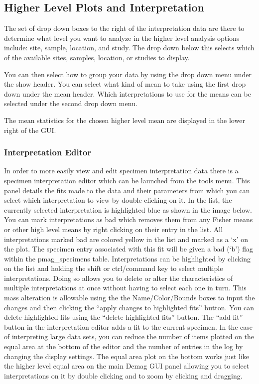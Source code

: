 \subsection{Higher Level Plots and
Interpretation}\label{higher-level-plots-and-interpretation}

The set of drop down boxes to the right of the interpretation data are
there to determine what level you want to analyze in the higher level
analysis options include: site, sample, location, and study. The drop
down below this selects which of the available sites, samples, location,
or studies to display.

You can then select how to group your data by using the drop down menu
under the show header. You can select what kind of mean to take using
the first drop down under the mean header. Which interpretations to use
for the means can be selected under the second drop down menu.

The mean statistics for the chosen higher level mean are displayed in
the lower right of the GUI.

\subsubsection{Interpretation Editor}\label{interpretation-editor}

In order to more easily view and edit specimen interpretation data there
is a specimen interpretation editor which can be launched from the tools
menu. This panel details the fits made to the data and their parameters
from which you can select which interpretation to view by double
clicking on it. In the list, the currently selected interpretation is
highlighted blue as shown in the image below. You can mark
interpretations as bad which removes them from any Fisher means or other
high level means by right clicking on their entry in the list. All
interpretations marked bad are colored yellow in the list and marked as
a `x' on the plot. The specimen entry associated with this fit will be
given a bad (`b') flag within the pmag\_specimens table. Interpretations
can be highlighted by clicking on the list and holding the shift or
ctrl/command key to select multiple interpretations. Doing so allows you
to delete or alter the characteristics of multiple interpretations at
once without having to select each one in turn. This mass alteration is
allowable using the the Name/Color/Bounds boxes to input the changes and
then clicking the ``apply changes to highlighted fits'' button. You can
delete highlighted fits using the ``delete highlighted fits'' button.
The ``add fit'' button in the interpretation editor adds a fit to the
current specimen. In the case of interpreting large data sets, you can
reduce the number of items plotted on the equal area at the bottom of
the editor and the number of entries in the log by changing the display
settings. The equal area plot on the bottom works just like the higher
level equal area on the main Demag GUI panel allowing you to select
interpretations on it by double clicking and to zoom by clicking and
dragging.

